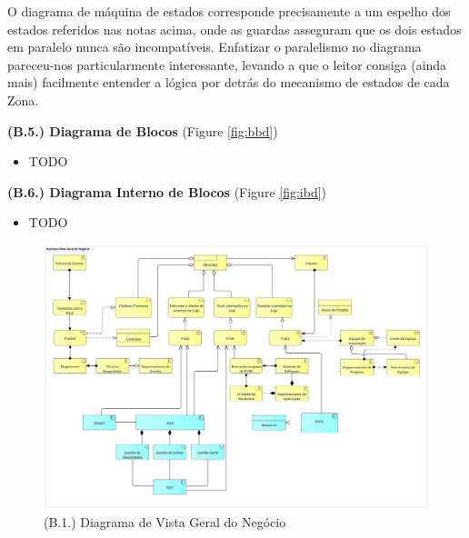 \documentclass[12pt,a4paper]{article}
\begin{document}
\begin{tcolorbox}[enhanced jigsaw,colback=bg,boxrule=0pt,arc=4pt]
  O diagrama de máquina de estados corresponde precisamente a um espelho dos estados referidos nas notas
  acima, onde as guardas asseguram que os dois estados em paralelo nunca são incompatíveis.
  Enfatizar o paralelismo no diagrama pareceu-nos particularmente interessante, levando
  a que o leitor consiga (ainda mais) facilmente entender a lógica por detrás do mecanismo
  de estados de cada Zona.

  \begin{small}
    \textbf{(B.5.) Diagrama de Blocos} (Figure \ref{fig:bbd})
  \end{small}
  \begin{itemize}
    \item TODO
  \end{itemize}

  \begin{small}
    \textbf{(B.6.) Diagrama Interno de Blocos} (Figure \ref{fig:ibd})
  \end{small}
  \begin{itemize}
    \item TODO
  \end{itemize}
\end{tcolorbox}

\begin{landscape}
  \begin{figure}
    \centering
    \includegraphics[width=1.5\textwidth]{assets/ea-archimate.png}
    \caption{(B.1.) Diagrama de Vista Geral do Negócio}
    \label{fig:archimate}
  \end{figure}
\end{landscape}
\end{document}
